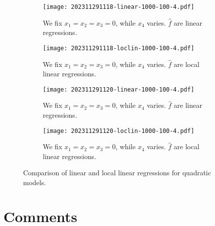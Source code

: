 \documentclass[12pt]{article}
\begin{document}
\begin{figure}[h]
    \centering
    \begin{subfigure}[b]{0.45\textwidth}
        \texttt{[image: 202311291118-linear-1000-100-4.pdf]}
        \caption{We fix \(x_{1} = x_{2} = x_{3} = 0\), while \(x_{4}\) varies. \(\hat{f}\) are linear regressions.}
        \label{fig:9}
    \end{subfigure}
    \hfill
    \begin{subfigure}[b]{0.45\textwidth}
        \texttt{[image: 202311291118-loclin-1000-100-4.pdf]}
        \caption{We fix \(x_{1} = x_{2} = x_{3} = 0\), while \(x_{4}\) varies. \(\hat{f}\) are local linear regressions.}
        \label{fig:10}
    \end{subfigure}
    \vfill
    \begin{subfigure}[b]{0.45\textwidth}
        \texttt{[image: 202311291120-linear-1000-100-4.pdf]}
        \caption{We fix \(x_{1} = x_{2} = x_{3} = 0\), while \(x_{4}\) varies. \(\hat{f}\) are linear regressions.}
        \label{fig:11}
    \end{subfigure}
    \hfill
    \begin{subfigure}[b]{0.45\textwidth}
        \texttt{[image: 202311291120-loclin-1000-100-4.pdf]}
        \caption{We fix \(x_{1} = x_{2} = x_{3} = 0\), while \(x_{4}\) varies. \(\hat{f}\) are local linear regressions.}
        \label{fig:12}
    \end{subfigure}
    \caption{Comparison of linear and local linear regressions for quadratic models.}
    \label{fig:comparison3}
\end{figure}
\newpage

\section{Comments}
\end{document}
